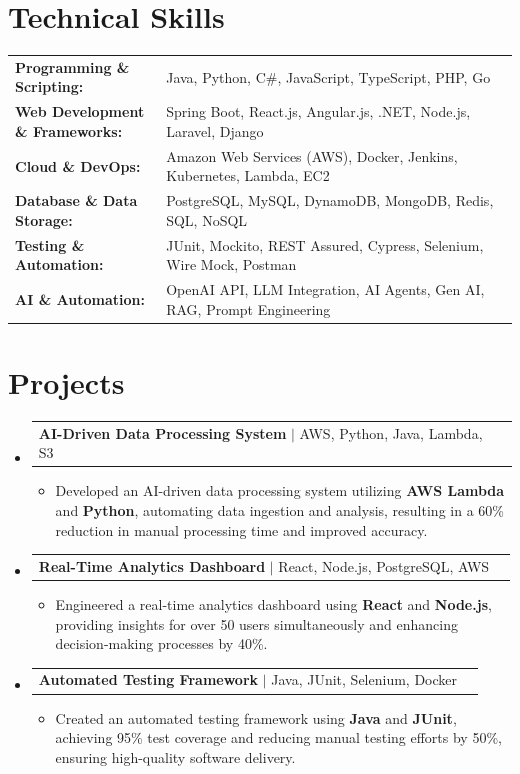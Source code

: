 \documentclass[letterpaper,10pt]{article}
\makeatletter
\newcommand{\resumeItem}[1]{
  \item{\fontsize{8pt}{9pt}\selectfont
    #1 \vspace{-3pt}
  }
}
\newcommand{\resumeProjectHeading}[2]{
    \item
    \begin{tabular*}{1.001\textwidth}{l@{\extracolsep{\fill}}r}
      \fontsize{8.5pt}{10pt}#1 & \textbf{\fontsize{8.5pt}{10pt} #2}\\
    \end{tabular*}\vspace{-7pt}
}
\newcommand{\resumeSubHeadingListStart}{\begin{itemize}[leftmargin=0pt, label={}]}
\newcommand{\resumeSubHeadingListEnd}{\end{itemize}}
\newcommand{\resumeItemListStart}{\begin{itemize}[leftmargin=*]}
\newcommand{\resumeItemListEnd}{\end{itemize}\vspace{-5pt}}
\makeatother
\begin{document}
\section{Technical Skills}
        \vspace{-14pt}
        \begin{table}[h]
            \fontsize{8pt}{9pt}\selectfont
            \begin{tabular}{p{0.3\linewidth} p{0.7\linewidth}}
                \textbf{Programming \& Scripting:} & Java, Python, C\#, JavaScript, TypeScript, PHP, Go \\
                \textbf{Web Development \& Frameworks:} & Spring Boot, React.js, Angular.js, .NET, Node.js, Laravel, Django \\
                \textbf{Cloud \& DevOps:} & Amazon Web Services (AWS), Docker, Jenkins, Kubernetes, Lambda, EC2 \\
                \textbf{Database \& Data Storage:} & PostgreSQL, MySQL, DynamoDB, MongoDB, Redis, SQL, NoSQL \\
                \textbf{Testing \& Automation:} & JUnit, Mockito, REST Assured, Cypress, Selenium, Wire Mock, Postman \\
                \textbf{AI \& Automation:} & OpenAI API, LLM Integration, AI Agents, Gen AI, RAG, Prompt Engineering \\
            \end{tabular}
        \end{table}
 \vspace{-18pt}

\section{Projects}
    \vspace{-5pt}
    \resumeSubHeadingListStart
          \resumeProjectHeading
            {\textbf{AI-Driven Data Processing System} $|$ AWS, Python, Java, Lambda, S3}{}
            \resumeItemListStart
                \resumeItem{Developed an AI-driven data processing system utilizing \textbf{AWS Lambda} and \textbf{Python}, automating data ingestion and analysis, resulting in a 60\% reduction in manual processing time and improved accuracy.}
            \resumeItemListEnd
        \vspace{-12pt}
    
        \resumeProjectHeading
            {\textbf{Real-Time Analytics Dashboard} $|$ React, Node.js, PostgreSQL, AWS}{}
        \resumeItemListStart
                \resumeItem{Engineered a real-time analytics dashboard using \textbf{React} and \textbf{Node.js}, providing insights for over 50 users simultaneously and enhancing decision-making processes by 40\%.}
        \resumeItemListEnd
      \vspace{-12pt}
      \resumeProjectHeading
        {\textbf{Automated Testing Framework} $|$ Java, JUnit, Selenium, Docker}{}
    \resumeItemListStart
            \resumeItem{Created an automated testing framework using \textbf{Java} and \textbf{JUnit}, achieving 95\% test coverage and reducing manual testing efforts by 50\%, ensuring high-quality software delivery.}
    \resumeItemListEnd
    \resumeSubHeadingListEnd
\end{document}
